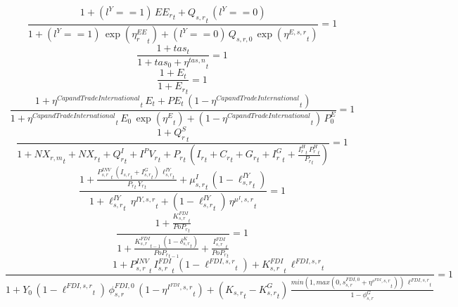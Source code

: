 \begin{dmath}
\frac{1+\left({{l^{Y}}}==1\right)\, {{EE_r}}_{t}+{{Q_{s,r}}}_{t}\, \left({{l^{Y}}}==0\right)}{1+\left({{l^{Y}}}==1\right)\, \exp\left({{\eta^{EE}_r}}_{t}\right)+\left({{l^{Y}}}==0\right)\, {{Q_{s,r,0}}}\, \exp\left({{\eta^{E,s,r}}}_{t}\right)}=1
\end{dmath}
\noindent[name= `tas']
\begin{dmath}
\frac{1+{{tas}}_{t}}{1+{{tas_{0}}}+{{\eta^{tas,n}}}_{t}}=1
\end{dmath}
\noindent[name= `aggregate emissions']
\begin{dmath}
\frac{1+{E}_{t}}{1+{{E_r}}_{t}}=1
\end{dmath}
\noindent[name= `price of emissions/emission cap']
\begin{dmath}
\frac{1+{{\eta^{Cap and Trade International}}}_{t}\, {E}_{t}+{PE}_{t}\, \left(1-{{\eta^{Cap and Trade International}}}_{t}\right)}{1+{{\eta^{Cap and Trade International}}}_{t}\, {{E_0}}\, \exp\left({{\eta^{E}}}_{t}\right)+\left(1-{{\eta^{Cap and Trade International}}}_{t}\right)\, {{P^E_0}}}=1
\end{dmath}
\noindent[name= `regional resource constraint 1']
\begin{dmath}
\frac{1+{{Q^S_r}}_{t}}{1+{{NX_{r,m}}}_{t}+{{NX_r}}_{t}+{{Q^I_r}}_{t}+{{I^PV_r}}_{t}+{{P_{r}}}_{t}\, \left({{I_{r}}}_{t}+{{C_r}}_{t}+{{G_{r}}}_{t}+{{I^G_{r}}}_{t}+\frac{{{I^H_r}}_{t}\, {{P^H_r}}_{t}}{{{P_{r}}}_{t}}\right)}=1
\end{dmath}
\noindent[name= `Investment-to-GDP wedge 1 1']
\begin{dmath}
\frac{1+\frac{{{P^{INV}_{s,r}}}_{t}\, \left({{I_{s,r}}}_{t}+{{I^G_{s,r}}}_{t}\right)\, {{\ell^{IY}_{s,r}}}_{t}}{{{P_{r}}}_{t}\, {{Y_r}}_{t}}+{{\mu^{I}_{s,r}}}_{t}\, \left(1-{{\ell^{IY}_{s,r}}}_{t}\right)}{1+{{\ell^{IY}_{s,r}}}_{t}\, {{\eta^{IY,s,r}}}_{t}+\left(1-{{\ell^{IY}_{s,r}}}_{t}\right)\, {{\eta^{\mu^{I},s,r}}}_{t}}=1
\end{dmath}
\noindent[name= `K\_FDI LOM 1 1']
\begin{dmath}
\frac{1+\frac{{{K^{FDI}_{s,r}}}_{t}}{{{PoP_r}}_{t}}}{1+\frac{{{K^{FDI}_{s,r}}}_{t-1}\, \left(1-{{\delta^{K}_{s,r}}}_{t}\right)}{{{PoP_r}}_{t-1}}+\frac{{{I^{FDI}_{s,r}}}_{t}}{{{PoP_r}}_{t}}}=1
\end{dmath}
\noindent[name= `I-FDI target 1 1']
\begin{dmath}
\frac{1+{{P^{INV}_{s,r}}}_{t}\, {{I^{FDI}_{s,r}}}_{t}\, \left(1-{{\ell^{FDI,s,r}}}_{t}\right)+{{K^{FDI}_{s,r}}}_{t}\, {{\ell^{FDI,s,r}}}_{t}}{1+{{Y_0}}\, \left(1-{{\ell^{FDI,s,r}}}_{t}\right)\, {{\phi^{FDI,0}_{s,r}}}\, \left(1-{{\eta^{I^{FDI},s,r}}}_{t}\right)+\left({{K_{s,r}}}_{t}-{{K^G_{s,r}}}_{t}\right)\, \frac{min(1,max(0,{{s^{FDI,0}_{s,r}}}+{{\eta^{s^{FDI},s,r}}}_{t}))\, {{\ell^{FDI,s,r}}}_{t}}{1-{{\phi^{G}_{s,r}}}}}=1
\end{dmath}
